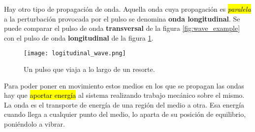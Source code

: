 Hay otro tipo de propagación de onda. Aquella onda cuya propagación es \hl{\textit{paralela}} a la perturbación provocada por el pulso se denomina \textbf{onda longitudinal}. Se puede comparar el pulso de onda \textbf{transversal} de la figura \ref{fig:wave_example} con el pulso de onda \textbf{longitudinal} de la figura \ref{fig:longitudinal_wave}.

\begin{figure}[ht]
  \centering
  \texttt{[image: logitudinal\_wave.png]}
  \caption{Un pulso que viaja a lo largo de un resorte.}
  \label{fig:longitudinal_wave}
\end{figure}

Para poder poner en movimiento estos medios en los que se propagan las ondas hay que \hl{aportar energía} al sistema realizando trabajo mecánico sobre el mismo. La onda es el transporte de energía de una región del medio a otra. Esa energía cuando llega a cualquier punto del medio, lo aparta de su posición de equilibrio, poniéndolo a vibrar. 







